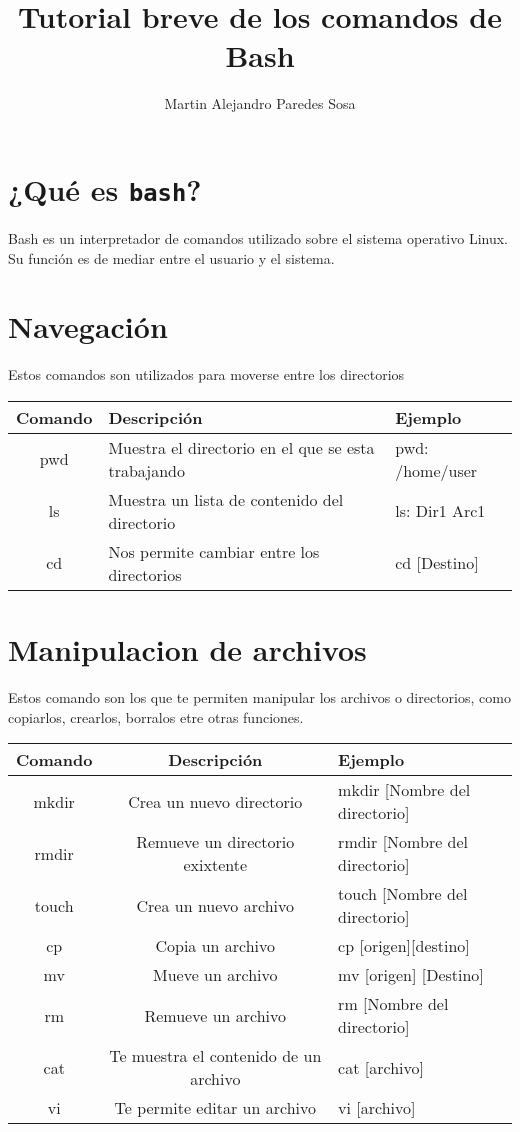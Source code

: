 \documentclass[12pt]{article}
\title{Tutorial breve de los comandos de Bash}
\author{Martin Alejandro Paredes Sosa}
\begin{document}
\maketitle

\section{¿Qué es {\tt bash}?}

Bash es un interpretador de comandos utilizado sobre el sistema operativo Linux. 
Su función es de mediar entre el usuario y el sistema.

\section{Navegación}
Estos comandos son utilizados para moverse entre los directorios \\
\begin{tabular}{|c|l|l|}
\hline
Comando & Descripción & Ejemplo \\
\hline
pwd & Muestra el directorio en el que se esta trabajando & pwd:  /home/user\\ \hline
ls & Muestra un lista de contenido del directorio & ls: Dir1 Arc1\\ \hline
cd & Nos permite cambiar entre los directorios & cd [Destino] \\
\hline
\end{tabular} 

\section{Manipulacion de archivos}
Estos comando son los que te permiten manipular los archivos o directorios, como copiarlos, crearlos, borralos etre otras funciones.\\
\begin{tabular}{|c|c|l|}
\hline Comando & Descripción & Ejemplo \\ \hline
mkdir & Crea un nuevo directorio & mkdir [Nombre del directorio] \\ \hline
rmdir & Remueve un directorio exixtente & rmdir [Nombre del directorio] \\ \hline
touch & Crea un nuevo archivo & touch [Nombre del directorio] \\ \hline
cp & Copia un archivo & cp [origen][destino] \\ \hline
mv & Mueve un archivo & mv [origen] [Destino] \\ \hline
rm & Remueve un archivo & rm [Nombre del directorio] \\ \hline
cat & Te muestra el contenido de un archivo & cat [archivo] \\ \hline
vi & Te permite editar un archivo & vi [archivo] \\ \hline

\end{tabular} 
\end{document}
